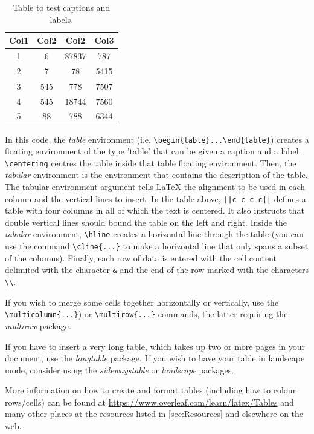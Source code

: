 \documentclass[11pt,twoside,openright]{report}
\begin{document}
\begin{table}[!ht]
 \centering
 \begin{tabular}{||c c c c||} 
 \hline
 Col1 & Col2 & Col2 & Col3 \\
 \hline\hline
 1 & 6 & 87837 & 787 \\ 
 2 & 7 & 78 & 5415 \\
 3 & 545 & 778 & 7507 \\
 4 & 545 & 18744 & 7560 \\
 5 & 88 & 788 & 6344 \\
 \hline
 \end{tabular}
 \caption{Table to test captions and labels.}
 \label{tab:MyFirstTable}
\end{table}

In this code, the \emph{table} environment (i.e. \verb|\begin{table}...\end{table}|) creates a floating environment of the type 'table' that can be given a caption and a label. 
\verb|\centering| centres the table inside that table floating environment. 
Then, the \emph{tabular} environment is the environment that contains the description of the table. 
The tabular environment argument tells LaTeX the alignment to be used in each column and the vertical lines to insert. 
In the table above, \verb!||c c c c||! defines a table with four columns in all of which the text is centered. It also instructs that double vertical lines should bound the table on the left and right. 
Inside the \emph{tabular} environment, \verb|\hline| creates a horizontal line through the table (you can use the command \verb|\cline{...}| to make a horizontal line that only spans a subset of the columns). Finally, each row of data is entered with the cell content delimited with the character \verb|&| and the end of the row marked with the characters \verb|\\|.

If you wish to merge some cells together horizontally or vertically, use the \verb|\multicolumn{...}|) or \verb|\multirow{...}| commands, the latter requiring the \emph{multirow} package.

If you have to insert a very long table, which takes up two or more pages in your document, use the \emph{longtable} package. If you wish to have your table in landscape mode, consider using the \emph{sidewaystable} or \emph{landscape} packages.  

More information on how to create and format tables (including how to colour rows/cells) can be found at \url{https://www.overleaf.com/learn/latex/Tables} and many other places at the resources listed in \cref{sec:Resources} and elsewhere on the web.
\end{document}
